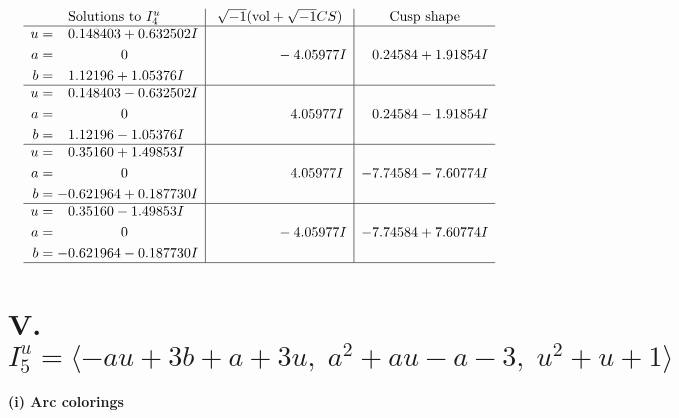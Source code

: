 \documentclass[1p]{elsarticle_modified}
\theoremstyle{definition}
\newcommand{\I}{\sqrt{-1}}
\begin{document}
$$\begin{array}{c|c|c}  
\text{Solutions to }I^u_{4}& \I (\text{vol} + \sqrt{-1}CS) & \text{Cusp shape}\\
 \hline 
\begin{aligned}
u &= \phantom{-}0.148403 + 0.632502 I \\
a &= \phantom{-0.000000 } 0 \\
b &= \phantom{-}1.12196 + 1.05376 I\end{aligned}
 & \phantom{-0.000000 } -4.05977 I & \phantom{-}0.24584 + 1.91854 I \\ \hline\begin{aligned}
u &= \phantom{-}0.148403 - 0.632502 I \\
a &= \phantom{-0.000000 } 0 \\
b &= \phantom{-}1.12196 - 1.05376 I\end{aligned}
 & \phantom{-0.000000 -}4.05977 I & \phantom{-}0.24584 - 1.91854 I \\ \hline\begin{aligned}
u &= \phantom{-}0.35160 + 1.49853 I \\
a &= \phantom{-0.000000 } 0 \\
b &= -0.621964 + 0.187730 I\end{aligned}
 & \phantom{-0.000000 -}4.05977 I & -7.74584 - 7.60774 I \\ \hline\begin{aligned}
u &= \phantom{-}0.35160 - 1.49853 I \\
a &= \phantom{-0.000000 } 0 \\
b &= -0.621964 - 0.187730 I\end{aligned}
 & \phantom{-0.000000 } -4.05977 I & -7.74584 + 7.60774 I\\
 \hline 
 \end{array}$$\newpage\newpage\renewcommand{\arraystretch}{1}
\centering \section*{V. $I^u_{5}= \langle - a u+3 b+a+3 u,\;a^2+a u- a-3,\;u^2+u+1 \rangle$}
\flushleft \textbf{(i) Arc colorings}\\
\end{document}

